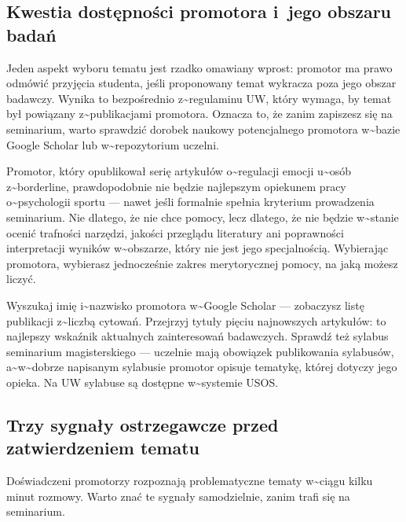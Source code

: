 \documentclass[12pt,a4paper,twoside,openany]{book}
\begin{document}
\subsection{Kwestia dostępności promotora i~jego obszaru badań}


Jeden aspekt wyboru tematu jest rzadko omawiany wprost: promotor ma prawo odmówić przyjęcia studenta, jeśli proponowany temat wykracza poza jego obszar badawczy. Wynika to bezpośrednio z\textasciitilde{}regulaminu UW, który wymaga, by temat był powiązany z\textasciitilde{}publikacjami promotora. Oznacza to, że zanim zapiszesz się na seminarium, warto sprawdzić dorobek naukowy potencjalnego promotora w\textasciitilde{}bazie Google Scholar lub w\textasciitilde{}repozytorium uczelni.


Promotor, który opublikował serię artykułów o\textasciitilde{}regulacji emocji u\textasciitilde{}osób z\textasciitilde{}borderline, prawdopodobnie nie będzie najlepszym opiekunem pracy o\textasciitilde{}psychologii sportu --- nawet jeśli formalnie spełnia kryterium prowadzenia seminarium. Nie dlatego, że nie chce pomocy, lecz dlatego, że nie będzie w\textasciitilde{}stanie ocenić trafności narzędzi, jakości przeglądu literatury ani poprawności interpretacji wyników w\textasciitilde{}obszarze, który nie jest jego specjalnością. Wybierając promotora, wybierasz jednocześnie zakres merytorycznej pomocy, na jaką możesz liczyć.


\begin{tipbox} Wyszukaj imię i\textasciitilde{}nazwisko promotora w\textasciitilde{}Google Scholar --- zobaczysz listę publikacji z\textasciitilde{}liczbą cytowań. Przejrzyj tytuły pięciu najnowszych artykułów: to najlepszy wskaźnik aktualnych zainteresowań badawczych. Sprawdź też sylabus seminarium magisterskiego --- uczelnie mają obowiązek publikowania sylabusów, a\textasciitilde{}w\textasciitilde{}dobrze napisanym sylabusie promotor opisuje tematykę, której dotyczy jego opieka. Na UW sylabuse są dostępne w\textasciitilde{}systemie USOS.
\end{tipbox}


\subsection{Trzy sygnały ostrzegawcze przed zatwierdzeniem tematu}


Doświadczeni promotorzy rozpoznają problematyczne tematy w\textasciitilde{}ciągu kilku minut rozmowy. Warto znać te sygnały samodzielnie, zanim trafi się na seminarium.
\end{document}
